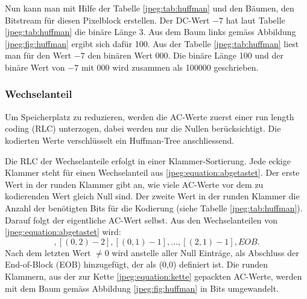 Nun kann man mit Hilfe der Tabelle \ref{jpeg:tab:huffman} und den Bäumen, den Bitstream für diesen Pixelblock erstellen.
Der DC-Wert \(-7\) hat laut Tabelle \ref{jpeg:tab:huffman} die binäre Länge 3.
Aus dem Baum links gemäss Abbildung \ref{jpeg:fig:huffman} ergibt sich dafür 100.
Aus der Tabelle \ref{jpeg:tab:huffman} liest man für den Wert \(-7\) den binären Wert 000.
Die binäre Länge 100 und der binäre Wert von \(-7\) mit 000 wird zusammen als 100000 geschrieben.

\subsubsection{Wechselanteil
\label{jpeg:subsubsection:wechselanteil}}
%
Um Speicherplatz zu reduzieren, werden die AC-Werte zuerst einer run length coding (RLC) unterzogen, dabei werden nur die Nullen berücksichtigt. 
%
Die kodierten Werte verschlüsselt ein Huffman-Tree anschliessend.

Die RLC der Wechselanteile erfolgt in einer Klammer-Sortierung.
Jede eckige Klammer steht für einen Wechselanteil aus \eqref{jpeg:equation:abgetastet}.
Der erste Wert in der runden Klammer gibt an, wie viele AC-Werte vor dem zu kodierenden Wert gleich Null sind.
Der zweite Wert in der runden Klammer die Anzahl der benötigten Bits für die Kodierung (siehe Tabelle \ref{jpeg:tab:huffman}).
Darauf folgt der eigentliche AC-Wert selbst.
Aus den Wechselanteilen von \eqref{jpeg:equation:abgetastet} wird:
\begin{equation}
    [(0,3)5],[(0,2)-2],[(0,1)-1],\dots,[(2,1)-1], EOB.
    \label{jpeg:equation:kette}
\end{equation}
Nach dem letzten Wert \(\neq 0\) wird anstelle aller Null Einträge, als Abschluss der End-of-Block (EOB) hinzugefügt, der als (0,0) definiert ist.
Die runden Klammern, aus der zur Kette \eqref{jpeg:equation:kette} gepackten AC-Werte,  werden mit dem Baum gemäss Abbildung \ref{jpeg:fig:huffman} in Bits umgewandelt.

